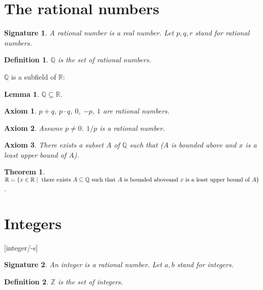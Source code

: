 \documentclass{article}
\newtheorem{axiom}{Axiom}
\newtheorem{lemma}{Lemma}
\newtheorem{theorem}{Theorem}
\newtheorem{definition}{Definition}
\newtheorem{signature}{Signature}
\begin{document}
\section{The rational numbers}

\begin{signature} A \emph{rational number} is a real number.
Let $p,q,r$ stand for rational numbers.\end{signature}

\begin{definition} $\mathbb{Q}$ is the set of rational numbers.
\end{definition}

$\mathbb{Q}$ is a subfield of $\mathbb{R}$:

\begin{lemma} $\mathbb{Q} \subseteq \mathbb{R}$.\end{lemma}

\begin{axiom} $p + q$, $p \cdot q$, $0$, $-p$, $1$ are 
rational numbers.\end{axiom}

\begin{axiom} Assume $p \neq 0$. $1/p$ is a rational number.
\end{axiom}

\begin{axiom} There exists a subset $A$ of $\mathbb{Q}$ 
such that ($A$ is bounded above and
$x$ is a least upper bound of $A$).
\end{axiom}

\begin{theorem} 
$\mathbb{R} = \{x \in \mathbb{R} \mid \text{ there exists }
A \subseteq \mathbb{Q}\text{ such that }
A\text{ is bounded above\\ and }x\text{ is a least upper
bound of }A\}$.
\end{theorem}

\section{Integers}

[integer/-s]

\begin{signature} An \emph{integer} is a rational number.
Let $a,b$ stand for integers.\end{signature}

\begin{definition} $\mathbb{Z}$ is the set of integers.\end{definition}
\end{document}
